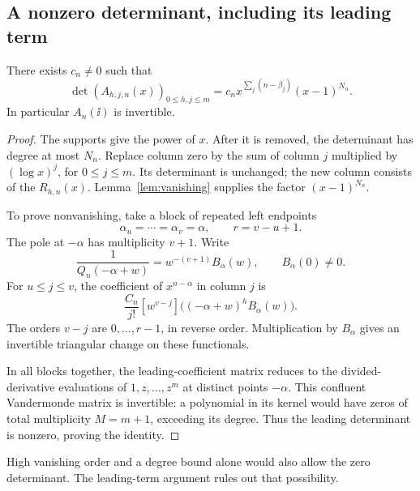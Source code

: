 \subsection{A nonzero determinant, including its leading term}

\begin{proposition}\label{prop:det}
There exists \(c_n\ne0\) such that
\begin{equation}\label{eq:detidentity}
\det(A_{h,j,n}(x))_{0\le h,j\le m}
=c_n x^{\sum_j(n-\beta_j)}(x-1)^{N_n}.
\end{equation}
In particular \(A_n(\ii)\) is invertible.
\end{proposition}
\begin{proof}
The supports give the power of \(x\). After it is removed, the
determinant has degree at most \(N_n\).
Replace column zero by the sum of column \(j\) multiplied by
\((\log x)^j\), for \(0\le j\le m\).
Its determinant is unchanged; the new column consists of the
\(R_{h,n}(x)\). Lemma~\ref{lem:vanishing} supplies the factor
\((x-1)^{N_n}\).

To prove nonvanishing, take a block of repeated left endpoints
\[
\alpha_u=\cdots=\alpha_v=\alpha,\qquad r=v-u+1.
\]
The pole at \(-\alpha\) has multiplicity \(v+1\). Write
\[
\frac1{Q_n(-\alpha+w)}
=w^{-(v+1)}B_\alpha(w),\qquad B_\alpha(0)\ne0.
\]
For \(u\le j\le v\), the coefficient of \(x^{n-\alpha}\) in column
\(j\) is
\[
\frac{C_n}{j!}[w^{v-j}]
\bigl((-\alpha+w)^hB_\alpha(w)\bigr).
\]
The orders \(v-j\) are \(0,\ldots,r-1\), in reverse order.
Multiplication by \(B_\alpha\) gives an invertible triangular
change on these functionals.

In all blocks together, the leading-coefficient matrix reduces to
the divided-derivative evaluations of \(1,z,\ldots,z^m\) at distinct
points \(-\alpha\). This confluent Vandermonde matrix is invertible:
a polynomial in its kernel would have zeros of total multiplicity
\(M=m+1\), exceeding its degree. Thus the leading determinant is
nonzero, proving the identity.
\end{proof}

High vanishing order and a degree bound alone would also allow the
zero determinant. The leading-term argument rules out that possibility.
